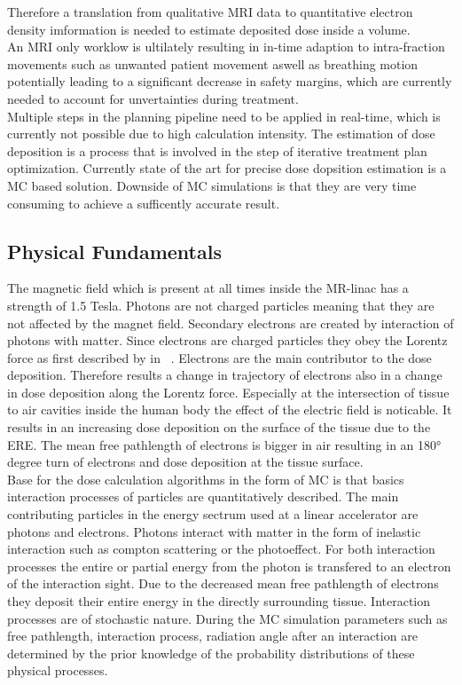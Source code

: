 Therefore a translation from qualitative MRI data to quantitative electron density imformation is needed to estimate deposited dose inside a volume.\\
An MRI only worklow is ultilately resulting in in-time adaption to intra-fraction movements such as unwanted patient movement aswell as breathing motion potentially leading to a significant decrease in safety margins, which are currently needed to account for unvertainties during treatment.\\
Multiple steps in the planning pipeline need to be applied in real-time, which is currently not possible due to high calculation intensity.
The estimation of dose deposition is a process that is involved in the step of iterative treatment plan optimization.
Currently state of the art for precise dose dopsition estimation is a \ac{MC} based solution.
Downside of \acs{MC} simulations is that they are very time consuming to achieve a sufficently accurate result.

\subsection{Physical Fundamentals}

The magnetic field which is present at all times inside the MR-linac has a strength of 1.5 Tesla.
Photons are not charged particles meaning that they are not affected by the magnet field.
Secondary electrons are created by interaction of photons with matter. 
Since electrons are charged particles they obey the Lorentz force as first described by \citeauthor{lorentz_versuch_1937} in \citeyear{lorentz_versuch_1937}~\cite{lorentz_versuch_1937}.  
Electrons are the main contributor to the dose deposition. 
Therefore results a change in trajectory of electrons also in a change in dose deposition along the Lorentz force.
Especially at the intersection of tissue to air cavities inside the human body the effect of the electric field is noticable.
It results in an increasing dose deposition on the surface of the tissue due to the \ac{ERE}.
The mean free pathlength of electrons is bigger in air resulting in an 180° degree turn of electrons and dose deposition at the tissue surface.\\
Base for the dose calculation algorithms in the form of \acs{MC} is that basics interaction processes of particles are quantitatively described.
The main contributing particles in the energy sectrum used at a linear accelerator are photons and electrons.
Photons interact with matter in the form of inelastic interaction such as compton scattering or the photoeffect. 
For both interaction processes the entire or partial energy from the photon is transfered to an electron of the interaction sight.
Due to the decreased mean free pathlength of electrons they deposit their entire energy in the directly surrounding tissue.
Interaction processes are of stochastic nature.
During the \acs{MC} simulation parameters such as free pathlength, interaction process, radiation angle after an interaction are determined by the prior knowledge of the probability distributions of these physical processes.


